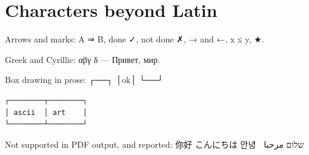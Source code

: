\documentclass[
]{article}
\author{}
\date{}
\begin{document}
\section{Characters beyond Latin}\label{characters-beyond-latin}

Arrows and marks: A ⇒ B, done ✓, not done ✗, → and ←, x ≤ y, ★.

Greek and Cyrillic: αβγ δ --- Привет, мир.

Box drawing in prose: ┌──┐ │ok│ └──┘

\begin{verbatim}
┌────────┬────────┐
│ ascii  │ art    │
└────────┴────────┘
\end{verbatim}

Not supported in PDF output, and reported: 你好 こんにちは 안녕 🚀 שלום
مرحبا
\end{document}

